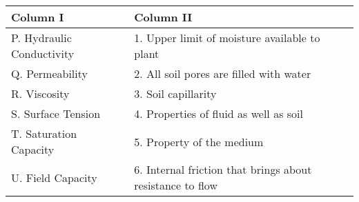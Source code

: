 \begin{table}[ht]
\centering
\begin{tabular}{|l|l|}
\hline
\textbf{Column I} & \textbf{Column II} \\ \hline
P. Hydraulic Conductivity   & 1. Upper limit of moisture available to plant \\ \hline
Q. Permeability            & 2. All soil pores are filled with water         \\ \hline
R. Viscosity               & 3. Soil capillarity                            \\ \hline
S. Surface Tension         & 4. Properties of fluid as well as soil          \\ \hline
T. Saturation Capacity     & 5. Property of the medium                      \\ \hline
U. Field Capacity          & 6. Internal friction that brings about resistance to flow \\ \hline
\end{tabular}
\end{table}